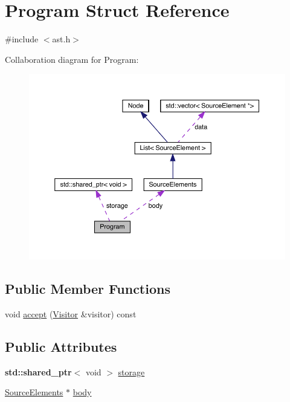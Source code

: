 \hypertarget{struct_program}{}\section{Program Struct Reference}
\label{struct_program}


{\ttfamily \#include $<$ast.\+h$>$}



Collaboration diagram for Program\+:
\nopagebreak
\begin{figure}[H]
\begin{center}
\leavevmode
\includegraphics[width=350pt]{struct_program__coll__graph}
\end{center}
\end{figure}
\subsection*{Public Member Functions}
\begin{DoxyCompactItemize}
\item 
void \hyperlink{struct_program_afbd3eb6a94760e56c25492ea1dc685ed}{accept} (\hyperlink{struct_visitor}{Visitor} \&visitor) const
\end{DoxyCompactItemize}
\subsection*{Public Attributes}
\begin{DoxyCompactItemize}
\item 
\textbf{ std\+::shared\+\_\+ptr}$<$ void $>$ \hyperlink{struct_program_aa25d5746067ab06823bf867e89dc8785}{storage}
\item 
\hyperlink{struct_source_elements}{Source\+Elements} $\ast$ \hyperlink{struct_program_a5a4db26ab169d8e65def12c02f5af6e5}{body}
\end{DoxyCompactItemize}


